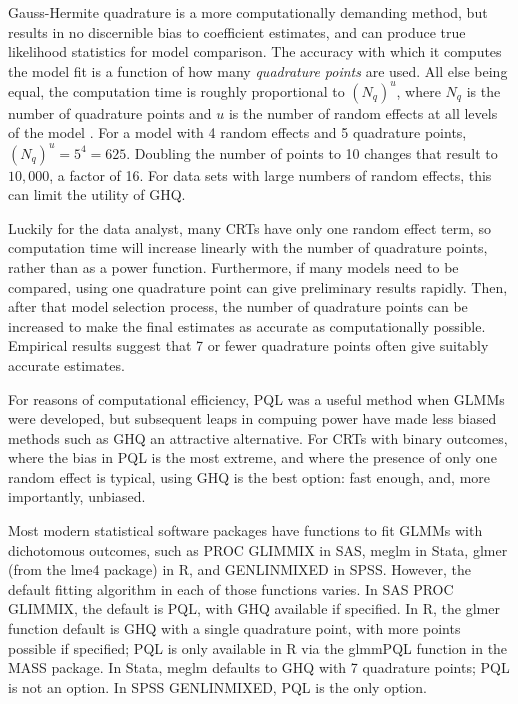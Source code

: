 \documentclass[Afour,times,sagev,doublespace]{sagej}
\begin{document}
Gauss-Hermite quadrature is a more computationally demanding method, but results in no discernible bias to coefficient estimates, and can produce true likelihood statistics for model comparison. The accuracy with which it computes the model fit is a function of how many \textit{quadrature points} are used. All else being equal, the computation time is roughly proportional to $(N_q)^u$, where $N_q$ is the number of quadrature points and $u$ is the number of random effects at all levels of the model \cite{statacorp_stata_2017}\cite{pinheiro_efficient_2006}. For a model with 4 random effects and 5 quadrature points, $(N_q)^u = 5^4 = 625$. Doubling the number of points to 10 changes that result to $10,000$, a factor of 16. For data sets with large numbers of random effects, this can limit the utility of GHQ.

Luckily for the data analyst, many CRTs have only one random effect term, so computation time will increase linearly with the number of quadrature points, rather than as a power function. Furthermore, if many models need to be compared, using one quadrature point can give preliminary results rapidly. Then, after that model selection process, the number of quadrature points can be increased to make the final estimates as accurate as computationally possible. Empirical results suggest that 7 or fewer quadrature points often give suitably accurate estimates\cite{pinheiro_approximations_1995}.

For reasons of computational efficiency, PQL was a useful method when GLMMs were developed, but subsequent leaps in compuing power have made less biased methods such as GHQ an attractive alternative. For CRTs with binary outcomes, where the bias in PQL is the most extreme\cite{ng_estimation_2006}\cite{lin_estimation_2007}, and where the presence of only one random effect is typical, using GHQ is the best option: fast enough, and, more importantly, unbiased.

Most modern statistical software packages have functions to fit GLMMs with dichotomous outcomes, such as PROC GLIMMIX in SAS, meglm in Stata, glmer (from the lme4 package) in R, and GENLINMIXED in SPSS. However, the default fitting algorithm in each of those functions varies. In SAS PROC GLIMMIX, the default is PQL, with GHQ available if specified. In R, the glmer function default is GHQ with a single quadrature point, with more points possible if specified; PQL is only available in R via the glmmPQL function in the MASS package. In Stata, meglm defaults to GHQ with 7 quadrature points; PQL is not an option. In SPSS GENLINMIXED, PQL is the only option.
\end{document}
